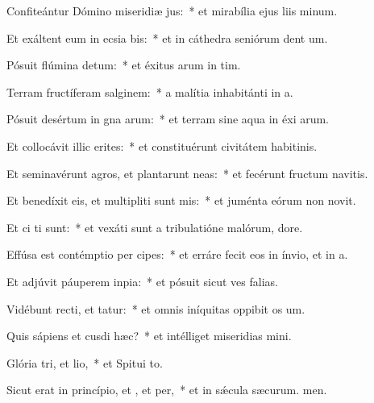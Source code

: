 \item Confiteántur Dómino miseridiæ jus:~* et mirabília ejus liis minum.
\item Et exáltent eum in ecsia bis:~* et in cáthedra seniórum dent um.
\item Pósuit flúmina  detum:~* et éxitus arum in tim.
\item Terram fructíferam  salginem:~* a malítia inhabitánti in a.
\item Pósuit desértum in gna arum:~* et terram sine aqua in éxi arum.
\item Et collocávit illic erites:~* et constituérunt civitátem habitinis.
\item Et seminavérunt agros, et plantarunt neas:~* et fecérunt fructum navitis.
\item Et benedíxit eis, et multipliti sunt mis:~* et juménta eórum non novit.
\item Et ci ti sunt:~* et vexáti sunt a tribulatióne malórum,  dore.
\item Effúsa est contémptio per cipes:~* et erráre fecit eos in ínvio, et  in a.
\item Et adjúvit páuperem  inpia:~* et pósuit sicut ves falias.
\item Vidébunt recti, et tatur:~* et omnis iníquitas oppibit os um.
\item Quis sápiens et cusdi hæc?~* et intélliget miseridias mini.
\item Glória tri, et lio,~* et Spitui to.
\item Sicut erat in princípio, et , et per,~* et in sǽcula sæcurum. men.
